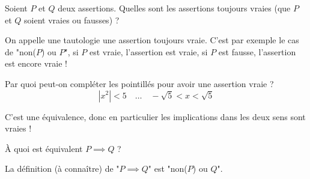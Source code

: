 \begin{question}

Soient $P$ et $Q$ deux assertions. Quelles sont les assertions toujours vraies (que $P$ et $Q$ soient vraies ou fausses)  ?
\begin{answers}



\end{answers}
\begin{explanations}
On appelle une tautologie une assertion toujours vraie. C'est par exemple le cas de "non($P$) ou $P$", si $P$ est vraie, l'assertion est vraie, si $P$ est fausse, l'assertion est encore vraie !
\end{explanations}
\end{question}


\begin{question}

Par quoi peut-on compléter les pointillés pour avoir une assertion vraie ?
$$|x^2| < 5 \quad \ldots \quad -\sqrt{5} < x < \sqrt{5}$$
\begin{answers}
    \good{$\Longleftarrow$}

    \good{$\implies$}

    \good{$\iff$}

\end{answers}
\begin{explanations}
C'est une équivalence, donc en particulier les implications dans les deux sens sont vraies !
\end{explanations}
\end{question}


\begin{question}

À quoi est équivalent $P \implies Q$ ?
\begin{answers}



\end{answers}
\begin{explanations}
La définition (à connaître) de "$P \implies Q$" est "non($P$) ou $Q$".
\end{explanations}
\end{question}


